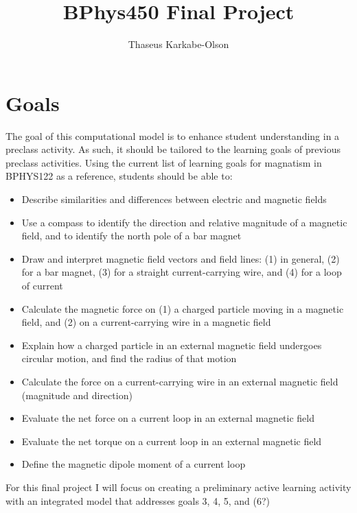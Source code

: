 \documentclass[11pt]{article}
\title{BPhys450 Final Project}
\author{Thaseus Karkabe-Olson}
\date{}
\begin{document}
	\maketitle

    \raggedright

    \section*{Goals}

        The goal of this computational model is to enhance student understanding in a preclass activity. As such, it should be tailored to the learning goals of previous preclass activities. Using the current list of learning goals for magnatism in BPHYS122 as a reference, students should be able to:

        \begin{itemize}

            \item Describe similarities and differences between electric and magnetic fields
            \item Use a compass to identify the direction and relative magnitude of a magnetic field, and to identify the north pole of a bar magnet
            \item Draw and interpret magnetic field vectors and field lines: (1) in general, (2) for a bar magnet, (3) for a straight current-carrying wire, and (4) for a loop of current
            \item Calculate the magnetic force on (1) a charged particle moving in a magnetic field, and (2) on a current-carrying wire in a magnetic field
            \item Explain how a charged particle in an external magnetic field undergoes circular motion, and find the radius of that motion
            \item Calculate the force on a current-carrying wire in an external magnetic field (magnitude and direction)
            \item Evaluate the net force on a current loop in an external magnetic field
            \item Evaluate the net torque on a current loop in an external magnetic field
            \item Define the magnetic dipole moment of a current loop

        \end{itemize}

        For this final project I will focus on creating a preliminary active learning activity with an integrated model that addresses goals 3, 4, 5, and (6?)
\end{document}
